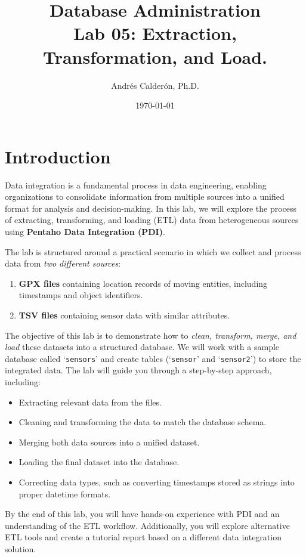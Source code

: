\documentclass{article}
\title{Database Administration \\ Lab 05: Extraction, Transformation, and Load.}
\author{Andrés Calderón, Ph.D.}
\date{\today}
\begin{document}
\maketitle

\section{Introduction}

Data integration is a fundamental process in data engineering, enabling organizations to consolidate information from multiple sources into a unified format for analysis and decision-making. In this lab, we will explore the process of extracting, transforming, and loading (ETL) data from heterogeneous sources using \textbf{Pentaho Data Integration (PDI)}.

The lab is structured around a practical scenario in which we collect and process data from \textit{two different sources}:

\begin{enumerate}
    \item \textbf{GPX files} containing location records of moving entities, including timestamps and object identifiers.
    \item \textbf{TSV files} containing sensor data with similar attributes.
\end{enumerate}

The objective of this lab is to demonstrate how to \textit{clean, transform, merge, and load} these datasets into a structured database. We will work with a sample database called `\texttt{sensors}' and create tables (`\texttt{sensor}' and `\texttt{sensor2}') to store the integrated data. The lab will guide you through a step-by-step approach, including:

\begin{itemize}
    \item Extracting relevant data from the files.
    \item Cleaning and transforming the data to match the database schema.
    \item Merging both data sources into a unified dataset.
    \item Loading the final dataset into the database.
    \item Correcting data types, such as converting timestamps stored as strings into proper datetime formats.
\end{itemize}

By the end of this lab, you will have hands-on experience with PDI and an understanding of the ETL workflow. Additionally, you will explore alternative ETL tools and create a tutorial report based on a different data integration solution.
\end{document}
